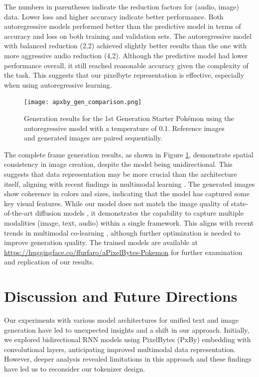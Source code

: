 \documentclass[10pt,a4paper]{article}
\begin{document}
The numbers in parentheses indicate the reduction factors for (audio, image) data. Lower loss and higher accuracy indicate better performance. Both autoregressive models performed better than the predictive model in terms of accuracy and loss on both training and validation sets. The autoregressive model with balanced reduction (2,2) achieved slightly better results than the one with more aggressive audio reduction (4,2). Although the predictive model had lower performance overall, it still reached reasonable accuracy given the complexity of the task. This suggests that our pixelbyte representation is effective, especially when using autoregressive learning.

\begin{figure}[ht]
\centering
\texttt{[image: apxby\_gen\_comparison.png]}
\caption{Generation results for the 1st Generation Starter Pokémon using the autoregressive model with a temperature of 0.1. Reference images and generated images are paired sequentially.}
\label{fig:generation_results}
\end{figure}

The complete frame generation results, as shown in Figure \ref{fig:generation_results}, demonstrate spatial consistency in image creation, despite the model being unidirectional. This suggests that data representation may be more crucial than the architecture itself, aligning with recent findings in multimodal learning \cite{baltruvsaitis2018multimodal}. The generated images show coherence in colors and sizes, indicating that the model has captured some key visual features. While our model does not match the image quality of state-of-the-art diffusion models \cite{dhariwal2021diffusion}, it demonstrates the capability to capture multiple modalities (image, text, audio) within a single framework. This aligns with recent trends in multimodal co-learning \cite{liang2022mind}, although further optimization is needed to improve generation quality. The trained models are available at \url{https://huggingface.co/ffurfaro/aPixelBytes-Pokemon} for further examination and replication of our results.

\section{Discussion and Future Directions}

Our experiments with various model architectures for unified text and image generation have led to unexpected insights and a shift in our approach. Initially, we explored bidirectional RNN models using PixelBytes (PxBy) embedding with convolutional layers, anticipating improved multimodal data representation. However, deeper analysis revealed limitations in this approach and these findings have led us to reconsider our tokenizer design. 
\end{document}
